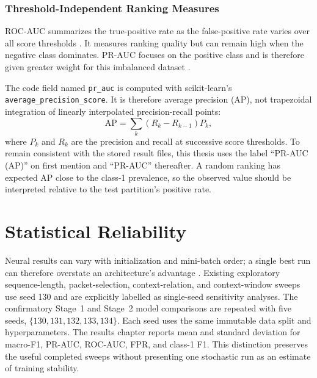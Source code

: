 \subsubsection{Threshold-Independent Ranking Measures}
\label{subsubsec:ranking_metrics}

ROC-AUC summarizes the true-positive rate as the false-positive rate varies
over all score thresholds \cite{Fawcett2006ROC}. It measures ranking quality
but can remain high when the negative class dominates. PR-AUC focuses on the
positive class and is therefore given greater weight for this imbalanced
dataset \cite{SaitoRehmsmeier2015}.

The code field named \texttt{pr\_auc} is computed with scikit-learn's
\texttt{average\_precision\_score}. It is therefore average precision (AP),
not trapezoidal integration of linearly interpolated precision-recall points:
\begin{equation}
    \mathrm{AP}=\sum_{k}(R_k-R_{k-1})P_k,
    \label{eq:average_precision}
\end{equation}
where $P_k$ and $R_k$ are the precision and recall at successive score
thresholds. To remain consistent with the stored result files, this thesis
uses the label ``PR-AUC (AP)'' on first mention and ``PR-AUC'' thereafter. A
random ranking has expected AP close to the class-1 prevalence, so the observed
value should be interpreted relative to the test partition's positive rate.

\section{Statistical Reliability}
\label{subsec:statistical_reliability}

Neural results can vary with initialization and mini-batch order; a single
best run can therefore overstate an architecture's advantage
\cite{ReimersGurevych2017,Bouthillier2021Variance}. Existing exploratory
sequence-length, packet-selection, context-relation, and context-window sweeps
use seed 130 and are explicitly labelled as single-seed sensitivity analyses.
The confirmatory Stage~1 and Stage~2 model comparisons are repeated with five
seeds, $\{130,131,132,133,134\}$. Each seed uses the same immutable data split
and hyperparameters. The results chapter reports mean and standard deviation
for macro-F1, PR-AUC, ROC-AUC, FPR, and class-1 F1. This distinction preserves
the useful completed sweeps without presenting one stochastic run as an
estimate of training stability.

